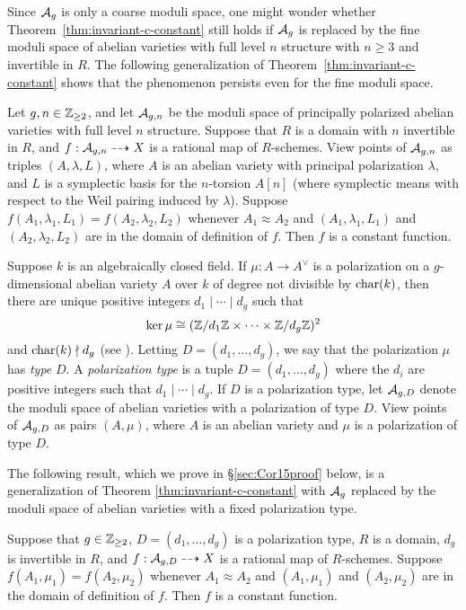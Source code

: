 \documentclass{amsart}
\begin{document}
Since $\mathcal{A}_g$ is only a coarse moduli space, one might wonder whether Theorem~\ref{thm:invariant-c-constant} still holds if $\mathcal{A}_g$  is replaced by the fine moduli space of abelian varieties with full level $n$ structure with $n\ge 3$ and invertible in $R$. The following generalization of 
Theorem~\ref{thm:invariant-c-constant} shows that the phenomenon persists even for the fine moduli space.

\begin{corollary}\label{cor:agn}
  Let $g,n \in \mathbb{Z}_{\geq 2}$, and let $\mathcal{A}_{g,n}$ be the moduli space of principally polarized abelian varieties with full level $n$ structure. Suppose that $R$ is a domain with $n$ invertible in $R$, and $f: \mathcal{A}_{g,n} \dashrightarrow X$ is a rational map of $R$-schemes. View points of $\mathcal{A}_{g,n}$ as triples  $(A, \lambda,L)$, where $A$ is an abelian variety with principal polarization $\lambda$, and $L$ is a symplectic basis for the $n$-torsion $A[n]$ (where symplectic means with respect to the Weil pairing induced by $\lambda$). Suppose $f(A_1,\lambda_1, L_1) = f(A_2,\lambda_2, L_2)$ whenever $A_1 \approx A_2$ and $(A_1,\lambda_1, L_1)$ and $(A_2,\lambda_2, L_2)$ are in the domain of definition of $f$. Then $f$ is a constant function.
\end{corollary}


Suppose $k$ is an algebraically closed field. If $\mu: A \to A^\vee$ is a polarization on a $g$-dimensional abelian variety $A$ over $k$ of degree not divisible by $\operatorname{char}(k)$, then there are unique positive integers $d_1 \mid \cdots \mid d_g$ such that
\[
  \ker \mu \cong (\mathbb{Z}/d_1\mathbb{Z} \times \cdots \times \mathbb{Z}/d_g\mathbb{Z})^2
\]
and $\operatorname{char}(k) \nmid d_g$ (see \cite[Theorem 1 et seq.]{mumford1966}). Letting $D = (d_1, \ldots, d_g)$, we say that the polarization $\mu$ has \emph{type} $D$. 
A \emph{polarization type} is a tuple ${D} = (d_1, \ldots, d_g)$ where the $d_i$ are positive integers such that $d_1 \mid \cdots \mid d_g$. If $D$ is a polarization type, let $\mathcal{A}_{g,{D}}$ denote the moduli space of abelian varieties with a polarization of type ${D}$. View points of $\mathcal{A}_{g,{D}}$ as pairs $(A,\mu)$, where $A$ is an abelian variety and $\mu$ is a polarization of type ${D}$. 

The following result, which we prove in \S\ref{sec:Cor15proof} below, is a generalization of Theorem \ref{thm:invariant-c-constant} with $\mathcal{A}_g$ replaced by the moduli space of  abelian varieties with a fixed %
polarization type. 

\begin{corollary}\label{cor:agpol}
  Suppose that $g \in \mathbb{Z}_{\geq 2}$, ${D} = (d_1, \ldots, d_g)$ is a polarization type, $R$ is a domain, $d_g$ is invertible in $R$, and  $f: \mathcal{A}_{g,{D}} \dashrightarrow X$ is a rational map of $R$-schemes. Suppose $f(A_1, \mu_1) = f(A_2, \mu_2)$ whenever $A_1 \approx A_2$ and $(A_1,\mu_1)$ and $(A_2,\mu_2)$ are in the domain of definition of $f$. Then $f$ is a constant function.
\end{corollary}
\end{document}

